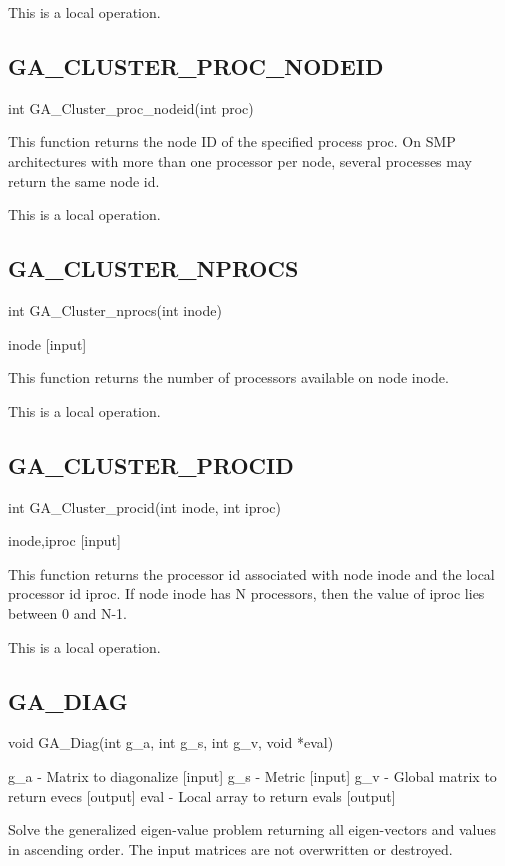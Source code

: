 This is a local operation. 


\subsection*{GA\_CLUSTER\_PROC\_NODEID}

int GA\_Cluster\_proc\_nodeid(int proc)

This function returns the node ID of the specified process proc. On
SMP architectures with more than one processor per node, several processes
may return the same node id.

This is a local operation. 


\subsection*{GA\_CLUSTER\_NPROCS}

int GA\_Cluster\_nprocs(int inode)

inode {[}input{]}

This function returns the number of processors available on node inode.

This is a local operation. 


\subsection*{GA\_CLUSTER\_PROCID}

int GA\_Cluster\_procid(int inode, int iproc)

inode,iproc {[}input{]}

This function returns the processor id associated with node inode
and the local processor id iproc. If node inode has N processors,
then the value of iproc lies between 0 and N-1.

This is a local operation. 


\subsection*{GA\_DIAG}

void GA\_Diag(int g\_a, int g\_s, int g\_v, void {*}eval)

g\_a - Matrix to diagonalize {[}input{]} g\_s - Metric {[}input{]}
g\_v - Global matrix to return evecs {[}output{]} eval - Local array
to return evals {[}output{]}

Solve the generalized eigen-value problem returning all eigen-vectors
and values in ascending order. The input matrices are not overwritten
or destroyed.

